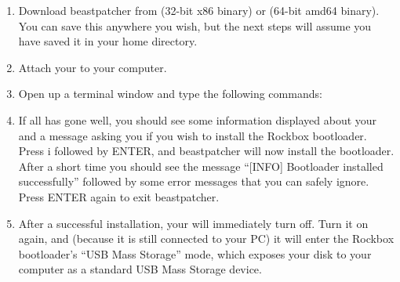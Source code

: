 \begin{enumerate}

\item Download beastpatcher from
 (32-bit x86 
binary) or  
(64-bit amd64 binary). You can save this anywhere you wish, but the next 
steps will assume you have saved it in your home directory.

\item Attach your \dap{} to your computer.

\item Open up a terminal window and type the following commands:


\item If all has gone well, you should see some information displayed about
your \dap{} and a message asking you if you wish to install the Rockbox
bootloader. Press i followed by ENTER, and beastpatcher will now install the
bootloader. After a short time you should see the message ``[INFO] Bootloader
installed successfully'' followed by some error
messages that you can safely ignore. Press ENTER again to exit beastpatcher.

\item After a successful installation, your \dap{} will immediately turn off.
Turn it on again, and (because it is still connected to your PC)
it will enter the Rockbox bootloader's
``USB Mass Storage'' mode, which exposes your \daps{} disk to your computer
as a standard USB Mass Storage device.

\end{enumerate}